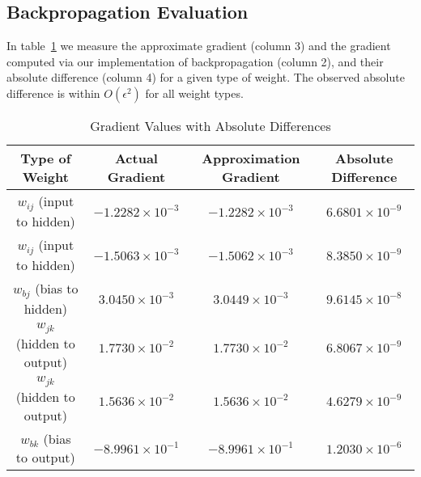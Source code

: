 \subsection{Backpropagation Evaluation}
In table~\ref{tab:gradient_table} we measure the approximate gradient (column 3)
and the gradient computed via our implementation of backpropagation (column 2),
and their absolute difference (column 4) for a given type of weight. The
observed absolute difference is within $O( \epsilon^2 )$ for all
weight types.
\begin{table}
	\renewcommand{\arraystretch}{1.25}
	\centering
	\begin{tabular}{|c|c|c|c|}
		\hline
		Type of Weight              & Actual Gradient          & Approximation Gradient   & Absolute Difference     \\
		\hline
		$w_{ij}$ (input to hidden)  & $-1.2282 \times 10^{-3}$ & $-1.2282 \times 10^{-3}$ & $6.6801 \times 10^{-9}$ \\
		$w_{ij}$ (input to hidden)  & $-1.5063 \times 10^{-3}$ & $-1.5062 \times 10^{-3}$ & $8.3850 \times 10^{-9}$ \\
		$w_{bj}$ (bias to hidden)   & $3.0450 \times 10^{-3}$  & $3.0449 \times 10^{-3}$  & $9.6145 \times 10^{-8}$ \\
		$w_{jk}$ (hidden to output) & $1.7730 \times 10^{-2}$  & $1.7730 \times 10^{-2}$  & $6.8067 \times 10^{-9}$ \\
		$w_{jk}$ (hidden to output) & $1.5636 \times 10^{-2}$  & $1.5636 \times 10^{-2}$  & $4.6279 \times 10^{-9}$ \\
		$w_{bk}$ (bias to output)   & $-8.9961 \times 10^{-1}$ & $-8.9961 \times 10^{-1}$ & $1.2030 \times 10^{-6}$ \\
		\hline
	\end{tabular}
	\vspace{0.25cm}
	\caption{Gradient Values with Absolute Differences}
	\label{tab:gradient_table}
\end{table}

